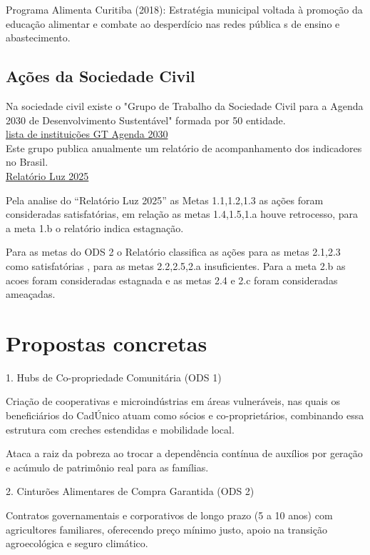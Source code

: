 Programa Alimenta Curitiba (2018): Estratégia municipal voltada à promoção da educação alimentar e combate ao desperdício nas redes pública  s de ensino e abastecimento.

\section{Ações da Sociedade Civil}
Na sociedade civil existe o "Grupo de Trabalho da Sociedade Civil para a Agenda 2030 de Desenvolvimento Sustentável"  formada por 50 entidade.\\
\href{https://gtagenda2030.org.br/quem-faz/}{lista de instituições GT Agenda 2030}\\
Este grupo publica anualmente um relatório de acompanhamento dos indicadores no Brasil.\\
\href{https://gtagenda2030.org.br/quem-faz/agenda2030.org.br/wp-content/uploads/2025/09/relatorio-luz-2025.pdf}{Relatório Luz 2025}

Pela analise do ``Relatório Luz 2025'' as Metas 1.1,1.2,1.3 as ações foram consideradas satisfatórias, em relação as metas 1.4,1.5,1.a houve retrocesso, para a meta 1.b o relatório indica estagnação.

Para as metas do ODS 2 o Relatório classifica as ações para as metas 2.1,2.3 como satisfatórias , para as metas 2.2,2.5,2.a insuficientes. Para a meta 2.b as acoes foram consideradas estagnada e as metas 2.4 e 2.c foram consideradas ameaçadas.

\chapter{Propostas concretas}

1. Hubs de Co-propriedade Comunitária (ODS 1)

Criação de cooperativas e microindústrias em áreas vulneráveis, nas quais os beneficiários do CadÚnico atuam como sócios e co-proprietários, combinando essa estrutura com creches estendidas e mobilidade local.

Ataca a raiz da pobreza ao trocar a dependência contínua de auxílios por geração e acúmulo de patrimônio real para as famílias.

2. Cinturões Alimentares de Compra Garantida (ODS 2)

Contratos governamentais e corporativos de longo prazo (5 a 10 anos) com agricultores familiares, oferecendo preço mínimo justo, apoio na transição agroecológica e seguro climático.

